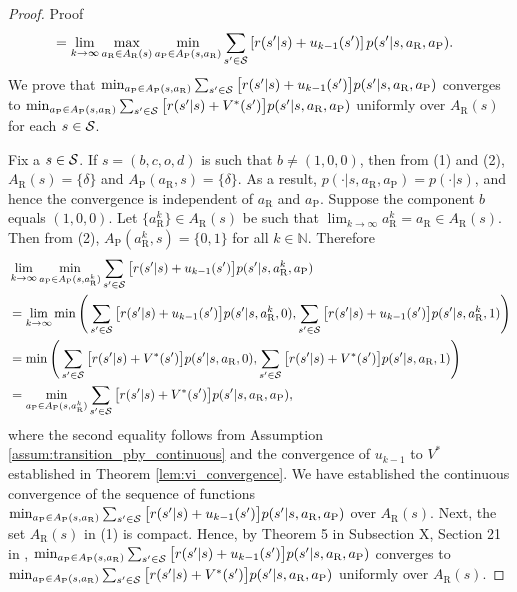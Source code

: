 \documentclass[opre,dblanonrev]{informs4}
\begin{document}
\begin{APPENDICES}
\begin{proof}{Proof}
\begin{align}
           \label{eqn:bellman_equation_temp1}
           &= \lim_{k \to \infty}\max_{a_\text{R} \in A_\text{R}(s)}\min_{a_\text{P} \in A_\text{P}(s,a_\text{R})}\sum_{s' \in {\cal S}}\left[r(s'|s) + u_{k-1}(s')\right]p(s'|s,a_\text{R},a_\text{P}).
           \end{align}
           \endgroup
           We prove that $\min_{a_\text{P} \in A_\text{P}(s,a_\text{R})}\sum_{s' \in {\cal S}}\big[r(s'|s) + u_{k-1}(s')\big]p(s'|s,a_\text{R},a_\text{P})$ converges to $\min_{a_\text{P} \in A_\text{P}(s,a_\text{R})}\sum_{s' \in {\cal S}}\big[r(s'|s) + V^*(s')\big]p(s'|s,a_\text{R},a_\text{P})$ uniformly over $A_\text{R}(s)$ for each $s \in {\cal S}$.
           
           Fix a $s \in {\cal S}$. If $s = (b,c,o,d)$ is such that $b \neq (1,0,0)$, then from (1) and (2),  $A_\text{R}(s) = \{\delta\}$ and $ A_\text{P}(a_\text{R},s) = \{\delta\}$. As a result, $p(\cdot|s,a_\text{R},a_\text{P}) = p(\cdot|s)$, and hence the convergence is independent of $a_\text{R}$ and $a_\text{P}$. Suppose the component $b$ equals $(1,0,0)$. Let $\{a_\text{R}^k\} \in A_\text{R}(s)$ be such that $\lim_{k \to \infty}a_\text{R}^k = a_\text{R} \in A_\text{R}(s)$. Then from  (2), $A_\text{P}(a_\text{R}^k,s) = \{0,1\}$ for all $k \in \mathbb{N}$. Therefore
           \begingroup
           \allowdisplaybreaks
           \begin{align*}
           &\lim_{k \to \infty}\min_{a_\text{P} \in A_\text{P}(s,a_\text{R}^k)}\sum_{s' \in {\cal S}}\big[r(s'|s) + u_{k-1}(s')\big]p(s'|s,a_\text{R}^k,a_\text{P}) \\
           &= \lim_{k \to \infty}\min\Bigg(\sum_{s' \in {\cal S}}\big[r(s'|s) + u_{k-1}(s')\big]p(s'|s,a_\text{R}^k,0),\sum_{s' \in {\cal S}}\big[r(s'|s) + u_{k-1}(s')\big]p(s'|s,a_\text{R}^k,1)\Bigg)\\
           &= \min\Bigg(\sum_{s' \in {\cal S}}\big[r(s'|s) + V^*(s')\big]p(s'|s,a_\text{R},0),\sum_{s' \in {\cal S}}\big[r(s'|s) + V^*(s')\big]p(s'|s,a_\text{R},1)\Bigg)\\
           &= \min_{a_\text{P} \in A_\text{P}(s,a_\text{R}^k)}\sum_{s' \in {\cal S}}\big[r(s'|s) + V^*(s')\big]p(s'|s,a_\text{R},a_\text{P}),
           \end{align*}
           \endgroup
           where the second equality follows from Assumption \ref{assum:transition_pby_continuous} and the convergence of $u_{k-1}$ to $V^*$ established in Theorem \ref{lem:vi_convergence}. We have established the continuous convergence of the sequence of functions $\min_{a_\text{P} \in A_\text{P}(s,a_\text{R})}\sum_{s' \in {\cal S}}\big[r(s'|s) + u_{k-1}(s')\big]p(s'|s,a_\text{R},a_\text{P})$ over $A_\text{R}(s)$. Next, the set $A_\text{R}(s)$ in (1)  is compact. Hence, by Theorem 5 in Subsection X, Section 21 in  \cite{kuratowski_topology_2014}, $\min_{a_\text{P} \in A_\text{P}(s,a_\text{R})}\sum_{s' \in {\cal S}}\big[r(s'|s) + u_{k-1}(s')\big]p(s'|s,a_\text{R},a_\text{P})$ converges to $\min_{a_\text{P} \in A_\text{P}(s,a_\text{R})}\sum_{s' \in {\cal S}}\big[r(s'|s) + V^*(s')\big]p(s'|s,a_\text{R},a_\text{P})$ uniformly over $A_\text{R}(s)$.
    

\end{proof}
\end{APPENDICES}
\end{document}
